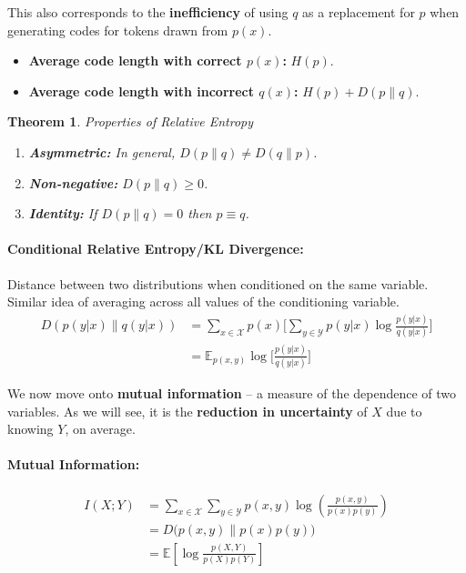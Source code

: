 \documentclass[a4paper,12pt]{report}
\newtheorem{theorem}{Theorem}
\begin{document}
This also corresponds to the \textbf{inefficiency} of using $q$ as a replacement
for $p$ when generating codes for tokens drawn from $p(x)$. 
\begin{itemize}
\item \textbf{Average code length with correct $p(x)$:} $H(p)$.
\item \textbf{Average code length with incorrect $q(x)$:} $H(p) + D(p \| q)$.
\end{itemize}

\begin{theorem}{Properties of Relative Entropy}
\begin{enumerate}
\item \textbf{Asymmetric: } In general, $D(p\| q) \neq D(q \| p)$.
\item \textbf{Non-negative: } $D(p\| q) \geq 0$.
\item \textbf{Identity: } If $D(p\| q) = 0$ then $p \equiv q$.
\end{enumerate}
\end{theorem}



\paragraph{Conditional Relative Entropy/KL Divergence: } Distance between two
distributions when conditioned on the same variable. Similar idea of averaging
across all values of the conditioning variable. 
\begin{align}\label{eqn:conditional_relative_entropy}
D(p(y|x) \| q(y | x)) &= \sum_{x\in \mathcal X}^{} p(x) \big[ \sum_{y\in \mathcal
Y}^{} p(y|x) \log \frac{p(y | x)}{q(y|x)}\big] \\
&= \mathbb E_{p(x,y)} \log \big[ \frac{p(y|x)}{q(y|x)}\big]
\end{align}







We now move onto \textbf{mutual information} -- a measure of the dependence of
two variables. As we will see, it is the \textbf{reduction in uncertainty} of
$X$ due to knowing $Y$, on average. 

\paragraph{Mutual Information: } \begin{align}
\label{eqn:mutual_info}
I(X; Y) &= \sum_{x\in \mathcal X}^{} \sum_{y\in \mathcal Y}^{} p(x, y) \log
(\frac{p(x,y)}{p(x)p(y)} ) \\ 
&= D\big(p(x,y) \| p(x)p(y) \big) \\
&= \mathbb E [\log \frac{p(X,Y)}{p(X)p(Y)}]
\end{align}
\end{document}
